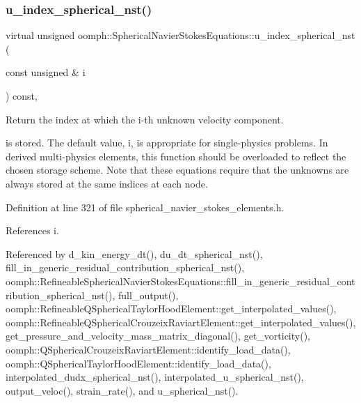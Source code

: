 \mbox{\label{classoomph_1_1SphericalNavierStokesEquations_a2f269e20874a87df919cc4ece4b05fe5}} 
\subsubsection{\texorpdfstring{u\+\_\+index\+\_\+spherical\+\_\+nst()}{u\_index\_spherical\_nst()}}
{\footnotesize\ttfamily virtual unsigned oomph\+::\+Spherical\+Navier\+Stokes\+Equations\+::u\+\_\+index\+\_\+spherical\+\_\+nst (\begin{DoxyParamCaption}\item[{const unsigned \&}]{i }\end{DoxyParamCaption}) const\hspace{0.3cm}{\ttfamily [inline]}, {\ttfamily [virtual]}}



Return the index at which the i-\/th unknown velocity component. 

is stored. The default value, i, is appropriate for single-\/physics problems. In derived multi-\/physics elements, this function should be overloaded to reflect the chosen storage scheme. Note that these equations require that the unknowns are always stored at the same indices at each node. 

Definition at line 321 of file spherical\+\_\+navier\+\_\+stokes\+\_\+elements.\+h.



References i.



Referenced by d\+\_\+kin\+\_\+energy\+\_\+dt(), du\+\_\+dt\+\_\+spherical\+\_\+nst(), fill\+\_\+in\+\_\+generic\+\_\+residual\+\_\+contribution\+\_\+spherical\+\_\+nst(), oomph\+::\+Refineable\+Spherical\+Navier\+Stokes\+Equations\+::fill\+\_\+in\+\_\+generic\+\_\+residual\+\_\+contribution\+\_\+spherical\+\_\+nst(), full\+\_\+output(), oomph\+::\+Refineable\+Q\+Spherical\+Taylor\+Hood\+Element\+::get\+\_\+interpolated\+\_\+values(), oomph\+::\+Refineable\+Q\+Spherical\+Crouzeix\+Raviart\+Element\+::get\+\_\+interpolated\+\_\+values(), get\+\_\+pressure\+\_\+and\+\_\+velocity\+\_\+mass\+\_\+matrix\+\_\+diagonal(), get\+\_\+vorticity(), oomph\+::\+Q\+Spherical\+Crouzeix\+Raviart\+Element\+::identify\+\_\+load\+\_\+data(), oomph\+::\+Q\+Spherical\+Taylor\+Hood\+Element\+::identify\+\_\+load\+\_\+data(), interpolated\+\_\+dudx\+\_\+spherical\+\_\+nst(), interpolated\+\_\+u\+\_\+spherical\+\_\+nst(), output\+\_\+veloc(), strain\+\_\+rate(), and u\+\_\+spherical\+\_\+nst().

